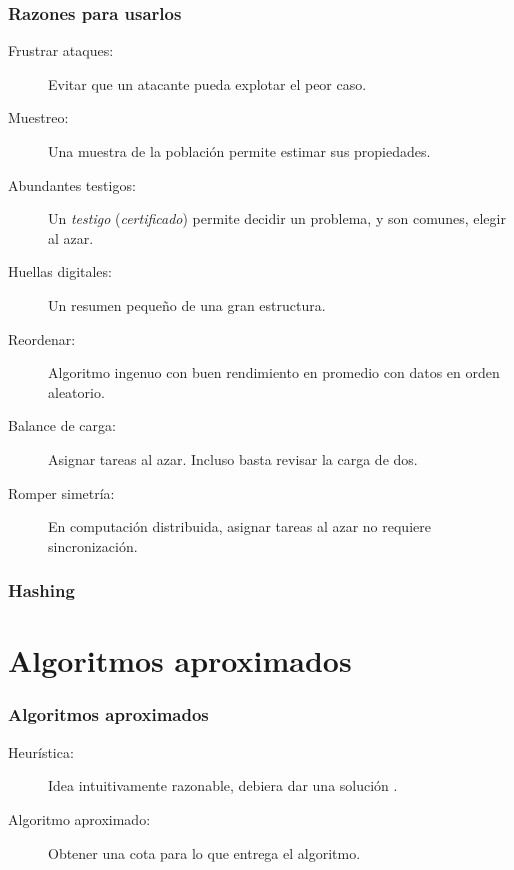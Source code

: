 \documentclass[english, spanish, fleqn,%
hyperref = {colorlinks, urlcolor = blue}%
]{beamer}
\begin{document}
\begin{frame}
  \setcounter{beamerpauses}{2}
  \frametitle{Razones para usarlos}

  \begin{description}
  \item[Frustrar ataques:]
    Evitar que un atacante pueda explotar el peor caso.
  \item[Muestreo:]
    Una muestra de la población permite estimar sus propiedades.
  \item[Abundantes testigos:]
    Un \emph{testigo}
    (\emph{certificado})
    permite decidir un problema,
    y son comunes,
    elegir al azar.
  \item[Huellas digitales:]
    Un resumen pequeño de una gran estructura.
  \item[Reordenar:]
    Algoritmo ingenuo con buen rendimiento en promedio
    con datos en orden aleatorio.
  \item[Balance de carga:]
    Asignar tareas al azar.
    Incluso basta revisar la carga de dos.
  \item[Romper simetría:]
    En computación distribuida,
    asignar tareas al azar no requiere sincronización.
  \end{description}
\end{frame}

\begin{frame}
  \setcounter{beamerpauses}{2}
  \frametitle{Hashing}

\end{frame}

\section{Algoritmos aproximados}

\begin{frame}
  \setcounter{beamerpauses}{2}
  \frametitle{Algoritmos aproximados}

  \begin{description}
  \item[Heurística:]
    Idea intuitivamente razonable,
    debiera dar una solución .
  \item[Algoritmo aproximado:]
    Obtener una cota para lo que entrega el algoritmo.
  \end{description}
\end{frame}
\end{document}
